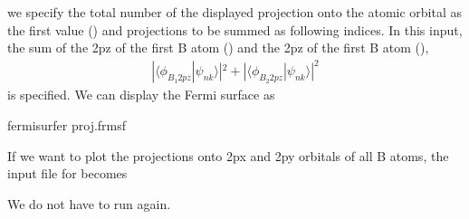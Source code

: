 \documentclass[letterpaper,10pt,pdftex,openany,english]{sphinxmanual}
\begin{document}
\sphinxAtStartPar
we specify the total number of the displayed projection onto the atomic orbital
as the first value () and projections to be summed as
following indices.
In this input, the sum of the 2pz of the first B atom ()
and the 2pz of the first B atom (),
\begin{equation*}
\begin{split}|\langle \phi_{B_1 2pz} | \psi_{nk} \rangle|^2
+ |\langle \phi_{B_2 2pz} | \psi_{nk} \rangle|^2\end{split}
\end{equation*}
\sphinxAtStartPar
is specified. We can display the Fermi surface as

\begin{sphinxVerbatim}[commandchars=\\\{\}]
\PYGZdl{} fermisurfer proj.frmsf
\end{sphinxVerbatim}

\begin{figure}[htbp]
\centering

\noindent{}
\end{figure}

\sphinxAtStartPar
If we want to plot the projections onto 2px and 2py orbitals of all B atoms,
the input file for  becomes

\begin{sphinxVerbatim}[commandchars=\\\{\}]
  
   
\end{sphinxVerbatim}

\sphinxAtStartPar
We do not have to run  again.

\begin{figure}[htbp]
\centering

\noindent{}
\end{figure}
\end{document}
